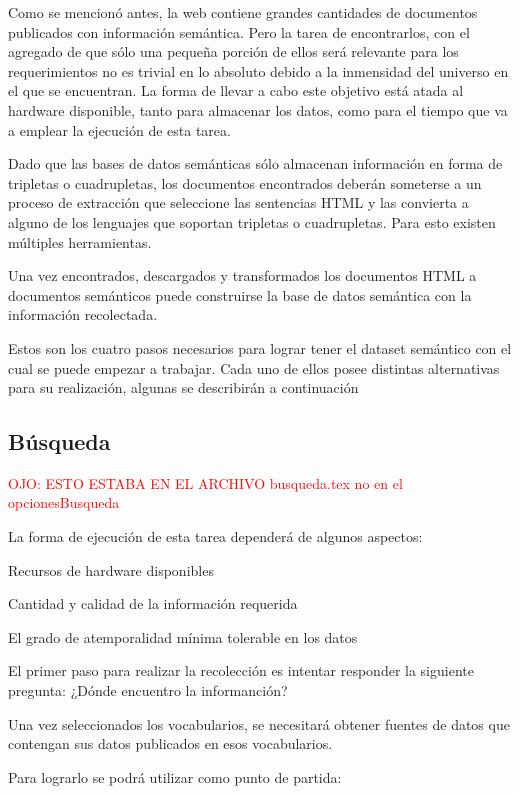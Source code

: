 %
Como se mencionó antes, la web contiene grandes cantidades de documentos publicados con información semántica. Pero la tarea
de encontrarlos, con el agregado de que sólo una pequeña porción de ellos será relevante para los requerimientos no es trivial
en lo absoluto debido a la inmensidad del universo en el que se encuentran. La forma de llevar a cabo este objetivo está 
atada al hardware disponible, tanto para almacenar los datos, como para el tiempo que va a emplear la ejecución de esta 
tarea.  

Dado que las bases de datos semánticas sólo almacenan información en forma de tripletas o cuadrupletas, los documentos encontrados 
deberán someterse a un proceso de extracción que seleccione las sentencias HTML y las convierta a alguno de los lenguajes que soportan  
tripletas o cuadrupletas. Para esto existen múltiples herramientas. 

Una vez encontrados, descargados y transformados los documentos HTML a documentos semánticos puede construirse la base de datos semántica 
con la información recolectada. 

Estos son los cuatro pasos necesarios para lograr tener el dataset semántico con el cual se puede empezar a trabajar. Cada uno de ellos 
posee distintas alternativas para su realización, algunas se describirán a continuación 



\subsection{Búsqueda}
%
\textcolor{red}{OJO: ESTO ESTABA EN EL ARCHIVO busqueda.tex no en el opcionesBusqueda}


La forma de ejecución de esta tarea dependerá de algunos aspectos:

Recursos de hardware disponibles

Cantidad y calidad de la información requerida

El grado de atemporalidad mínima tolerable en los datos

El primer paso para realizar la recolección es intentar responder la siguiente pregunta: ¿Dónde encuentro la informanción?

Una vez seleccionados los vocabularios, se necesitará obtener fuentes de datos que contengan sus datos publicados en esos vocabularios.
 
Para lograrlo se podrá utilizar como punto de partida:

